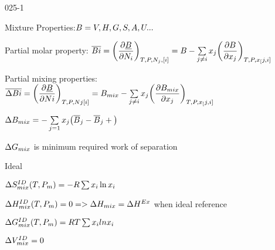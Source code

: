 \begin{mitframe}{025-1}

    
\begin{listone}
          \item Mixture Properties:$B=\vol,\enthalpy,\gibbs,\entropy,\helmholtz,\intenergy...$
                
\item Partial molar property: $\overline{B{i}}=\bigg(\dfrac{\partial\uline{B}}{\partial\nummoles_{i}}\bigg)_{\Temp,\p,\nummoles_{j},[i]}=B-\sum\limits_{j \neq i}\specfrac{j}\bigg(\dfrac{\partial B}{\partial\specfrac{j}}\bigg)_{\Temp,\p,\specfrac[j,i]}$
          
         
         
    \item Partial mixing properties: $\overline{\iipf{B}{i}}=\bigg(\dfrac{\partial\uline{B}}{\partial\nummoles{i}}\bigg)_{\Temp,\p,\nummoles{j}[i]}=B_{mix}-\sum\limits_{j\neq i}\specfrac{j}\bigg(\dfrac{\partial{B}_{mix}}{\partial\specfrac{j}}\bigg)_{\Temp,\p,\specfrac[j,i]} $
    
    \item $\iipf{B}_{mix}=-\sum\limits_{j=1}\specfrac{j}\big(\overline{B}_j-\overline{B}_j+\big)$
    
    \item $\iipf\gibbs_{mix}$ is minimum required work of separation
        
    \item Ideal

	\item $\iipf\entropy_{mix} ^{\mominertia\elecdisplace}(\Temp,\p_{\mass})=-\gasconst\sum\nolimits\specfrac{i}\ln\specfrac{i}$
    
    \item $\iipf\enthalpy_{mix}^{\mominertia\elecdisplace}(\Temp,\p_{\mass})=0=>\iipf\enthalpy_{mix}=\iipf\enthalpy^{\energy\disp}$  when ideal reference
     
          \item $\iipf\gibbs_{mix}^{\mominertia\elecdisplace}(\Temp,\p_{\mass})=\gasconst\Temp\sum\nolimits\specfrac{i}ln\specfrac{i}$
    
    \item $\iipf\vol_{mix}^{\mominertia\elecdisplace}=0$
                   
\end{listone}			

\end{mitframe}